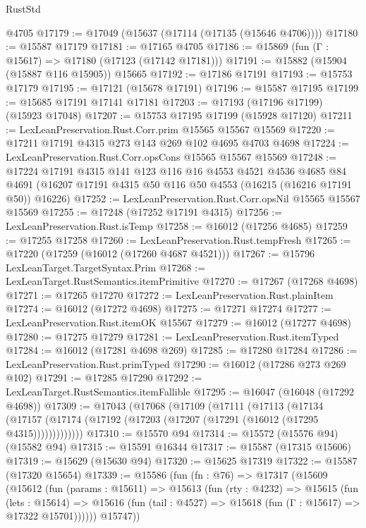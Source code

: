 \begin{lexlean}{RustStd}
\begin{coremodule}
    @4705
@17179 := @17049 (@15637 (@17114 (@17135 (@15646 @4706))))
@17180 := @15587 @17179
@17181 := @17165 @4705
@17186 := @15869 (fun (Γ : @15617) => @17180 (@17123 (@17142 @17181)))
@17191 := @15882 (@15904 (@15887 @116 @15905)) @15665
@17192 := @17186 @17191
@17193 := @15753 @17179
@17195 := @17121 (@15678 @17191)
@17196 := @15587 @17195
@17199 := @15685 @17191 @17141 @17181
@17203 := @17193 (@17196 @17199) (@15923 @17048)
@17207 := @15753 @17195 @17199 (@15928 @17120)
@17211 := LexLeanPreservation.Rust.Corr.prim @15565 @15567 @15569
@17220 := @17211 @17191 @4315 @273 @143 @269 @102 @4695 @4703 @4698
@17224 := LexLeanPreservation.Rust.Corr.opsCons @15565 @15567 @15569
@17248 := @17224
    @17191
    @4315
    @141
    @123
    @116
    @16
    @4553
    @4521
    @4536
    @4685
    @84
    @4691
    (@16207 @17191 @4315 @50 @116 @50 @4553 (@16215 (@16216 @17191 @50)) @16226)
@17252 := LexLeanPreservation.Rust.Corr.opsNil @15565 @15567 @15569
@17255 := @17248 (@17252 @17191 @4315)
@17256 := LexLeanPreservation.Rust.isTemp
@17258 := @16012 (@17256 @4685)
@17259 := @17255 @17258
@17260 := LexLeanPreservation.Rust.tempFresh
@17265 := @17220 (@17259 (@16012 (@17260 @4687 @4521)))
@17267 := @15796 LexLeanTarget.TargetSyntax.Prim
@17268 := LexLeanTarget.RustSemantics.itemPrimitive
@17270 := @17267 (@17268 @4698)
@17271 := @17265 @17270
@17272 := LexLeanPreservation.Rust.plainItem
@17274 := @16012 (@17272 @4698)
@17275 := @17271 @17274
@17277 := LexLeanPreservation.Rust.itemOK @15567
@17279 := @16012 (@17277 @4698)
@17280 := @17275 @17279
@17281 := LexLeanPreservation.Rust.itemTyped
@17284 := @16012 (@17281 @4698 @269)
@17285 := @17280 @17284
@17286 := LexLeanPreservation.Rust.primTyped
@17290 := @16012 (@17286 @273 @269 @102)
@17291 := @17285 @17290
@17292 := LexLeanTarget.RustSemantics.itemFallible
@17295 := @16047 (@16048 (@17292 @4698))
@17309 := @17043
    (@17068
      (@17109
        (@17111
          (@17113
            (@17134
              (@17157 (@17174 (@17192 (@17203 (@17207 (@17291 (@16012 (@17295 @4315)))))))))))))
@17310 := @15570 @94
@17314 := @15572 (@15576 @94) (@15582 @94)
@17315 := @15591 @16344
@17317 := @15587 (@17315 @15606)
@17319 := @15629 (@15630 @94)
@17320 := @15625 @17319
@17322 := @15587 (@17320 @15654)
@17339 := @15586
    (fun (fn : @76) =>
    @17317
      (@15609
        (@15612
          (fun (params : @15611) =>
          @15613
            (fun (rty : @4232) =>
            @15615
              (fun (lets : @15614) =>
              @15616 (fun (tail : @4527) => @15618 (fun (Γ : @15617) => @17322 @15701))))))
        @15747))

\end{coremodule}
\end{lexlean}
